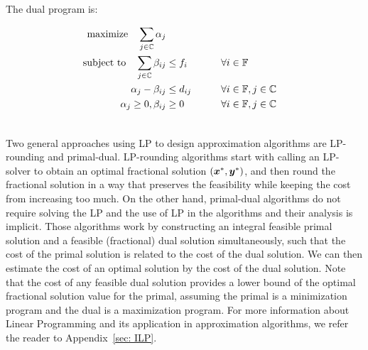 \documentclass[oneside,final]{ucr}
\begin{document}

\noindent
The dual program is:

\begin{alignat}{3}
  \textrm{maximize}\quad \sum_{j\in \mathbb{C}} \alpha_j&\label{eqn:ufl_dual}  
  \\ \notag
  \textrm{subject to} \quad 
  \sum_{j\in \mathbb{C}}\beta_{ij} &\leq f_i  &\quad\quad &\forall i \in \mathbb{F}  
  \\ \notag
  \alpha_{j} - \beta_{ij} &\leq  d_{ij} &  & \forall i\in \mathbb{F}, j\in \mathbb{C} 
  \\ \notag
  \alpha_j \geq 0, \beta_{ij} &\geq 0 &  & \forall i\in \mathbb{F}, j\in \mathbb{C}
  \\ \notag
\end{alignat}

Two general approaches using LP to design approximation
algorithms are LP-rounding and primal-dual. LP-rounding
algorithms start with calling an LP-solver to obtain an
optimal fractional solution $(\boldsymbol{x}^\ast,\boldsymbol{y}^\ast)$, and
then round the fractional solution in a way that preserves
the feasibility while keeping the cost from increasing too
much. On the other hand, primal-dual algorithms do not
require solving the LP and the use of LP in the algorithms
and their analysis is implicit. Those algorithms work by
constructing an integral feasible primal solution and a
feasible (fractional) dual solution simultaneously, such
that the cost of the primal solution is related to the cost
of the dual solution. We can then estimate the cost of an
optimal solution by the cost of the dual solution. Note that
the cost of any feasible dual solution provides a lower
bound of the optimal fractional solution value for the
primal, assuming the primal is a minimization program and
the dual is a maximization program. For more information
about Linear Programming and its application in
approximation algorithms, we refer the reader to
Appendix~\ref{sec: ILP}.
\end{document}
